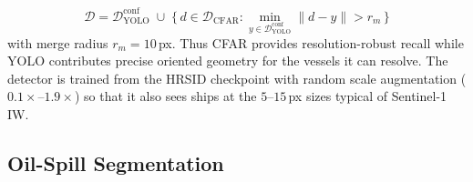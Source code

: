 \documentclass{ieeeaccess}
\begin{document}
\begin{equation}
\mathcal{D} = \mathcal{D}_{\text{YOLO}}^{\text{conf}} \;\cup\;
\{\,d \in \mathcal{D}_{\text{CFAR}} : \min_{y\in\mathcal{D}_{\text{YOLO}}^{\text{conf}}}
\lVert d - y\rVert > r_m\,\}
\label{eq:merge}
\end{equation}
with merge radius $r_m=10$\,px. Thus CFAR provides resolution-robust recall while YOLO contributes precise oriented geometry for the vessels it can resolve. The detector is trained from the HRSID checkpoint with random scale augmentation ($0.1\times$--$1.9\times$) so that it also sees ships at the $5$--$15$\,px sizes typical of Sentinel-1 IW.

\subsection{Oil-Spill Segmentation}
\label{subsec:oil}
\end{document}
